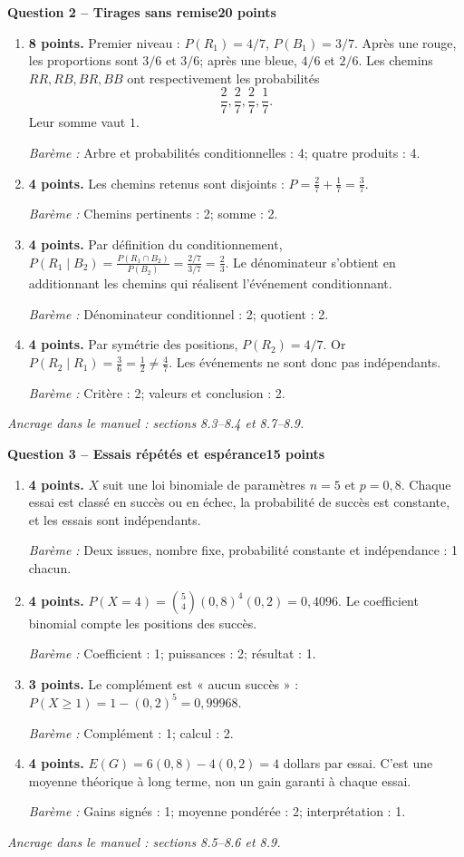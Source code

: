 \documentclass[11pt,a4paper]{article}
\begin{document}
\newpage
{\large\bfseries Question 2 -- Tirages sans remise}\hfill\textbf{20 points}\par
\begin{enumerate}
\item \textbf{8 points.} Premier niveau : \(P(R_1)=4/7\), \(P(B_1)=3/7\). Après une rouge, les proportions sont \(3/6\) et \(3/6\); après une bleue, \(4/6\) et \(2/6\). Les chemins \(RR,RB,BR,BB\) ont respectivement les probabilités \[\frac27,\frac27,\frac27,\frac17.\] Leur somme vaut \(1\).
\par{\small\textit{Barème : }Arbre et probabilités conditionnelles : 4; quatre produits : 4.}
\item \textbf{4 points.} Les chemins retenus sont disjoints : \(P=\frac27+\frac17=\frac37\).
\par{\small\textit{Barème : }Chemins pertinents : 2; somme : 2.}
\item \textbf{4 points.} Par définition du conditionnement, \(P(R_1\mid B_2)=\frac{P(R_1\cap B_2)}{P(B_2)}=\frac{2/7}{3/7}=\frac23\). Le dénominateur s’obtient en additionnant les chemins qui réalisent l’événement conditionnant.
\par{\small\textit{Barème : }Dénominateur conditionnel : 2; quotient : 2.}
\item \textbf{4 points.} Par symétrie des positions, \(P(R_2)=4/7\). Or \(P(R_2\mid R_1)=\frac36=\frac12\ne\frac47\). Les événements ne sont donc pas indépendants.
\par{\small\textit{Barème : }Critère : 2; valeurs et conclusion : 2.}
\end{enumerate}
\vfill {\small\textit{Ancrage dans le manuel : sections 8.3--8.4 et 8.7--8.9.}}

\newpage
{\large\bfseries Question 3 -- Essais répétés et espérance}\hfill\textbf{15 points}\par
\begin{enumerate}
\item \textbf{4 points.} \(X\) suit une loi binomiale de paramètres \(n=5\) et \(p=0{,}8\). Chaque essai est classé en succès ou en échec, la probabilité de succès est constante, et les essais sont indépendants.
\par{\small\textit{Barème : }Deux issues, nombre fixe, probabilité constante et indépendance : 1 chacun.}
\item \textbf{4 points.} \(P(X=4)=\binom54(0{,}8)^4(0{,}2)=0{,}4096\). Le coefficient binomial compte les positions des succès.
\par{\small\textit{Barème : }Coefficient : 1; puissances : 2; résultat : 1.}
\item \textbf{3 points.} Le complément est « aucun succès » : \(P(X\ge1)=1-(0{,}2)^5=0{,}99968\).
\par{\small\textit{Barème : }Complément : 1; calcul : 2.}
\item \textbf{4 points.} \(E(G)=6(0{,}8)-4(0{,}2)=4\) dollars par essai. C’est une moyenne théorique à long terme, non un gain garanti à chaque essai.
\par{\small\textit{Barème : }Gains signés : 1; moyenne pondérée : 2; interprétation : 1.}
\end{enumerate}
\vfill {\small\textit{Ancrage dans le manuel : sections 8.5--8.6 et 8.9.}}
\end{document}
